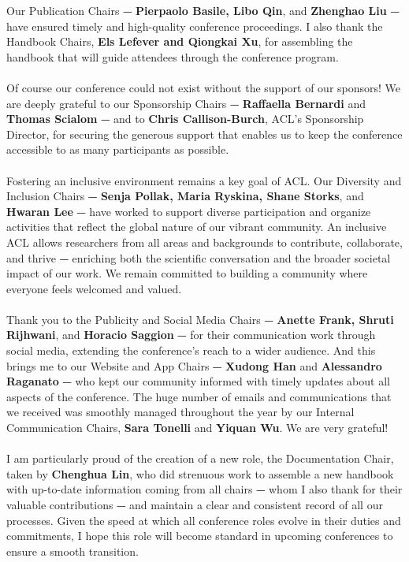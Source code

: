 Our Publication Chairs ⏤ \textbf{Pierpaolo Basile, Libo Qin}, and \textbf{Zhenghao Liu} ⏤ have ensured timely and high-quality conference proceedings. I also thank the Handbook Chairs, \textbf{Els Lefever and Qiongkai Xu}, for assembling the handbook that will guide attendees through the conference program.\\
\\

Of course our conference could not exist without the support of our sponsors! We are deeply grateful to our Sponsorship Chairs ⏤ \textbf{Raffaella Bernardi} and \textbf{Thomas Scialom} ⏤ and to \textbf{Chris Callison-Burch}, ACL’s Sponsorship Director, for securing the generous support that enables us to keep the conference accessible to as many participants as possible.\\
\\

Fostering an inclusive environment remains a key goal of ACL. Our Diversity and Inclusion Chairs ⏤ \textbf{Senja Pollak, Maria Ryskina, Shane Storks}, and \textbf{Hwaran Lee} ⏤ have worked to support diverse participation and organize activities that reflect the global nature of our vibrant community. An inclusive ACL allows researchers from all areas and backgrounds to contribute, collaborate, and thrive ⏤ enriching both the scientific conversation and the broader societal impact of our work. We remain committed to building a community where everyone feels welcomed and valued.\\
\\

Thank you to the Publicity and Social Media Chairs ⏤ \textbf{Anette Frank, Shruti Rijhwani}, and \textbf{Horacio Saggion} ⏤ for their communication work through social media, extending the conference’s reach to a wider audience. And this brings me to our Website and App Chairs ⏤ \textbf{Xudong Han} and \textbf{Alessandro Raganato} ⏤ who kept our community informed with timely updates about all aspects of the conference. The huge number of emails and communications that we received was smoothly managed throughout the year by our Internal Communication Chairs, \textbf{Sara Tonelli} and \textbf{Yiquan Wu}. We are very grateful!\\
\\

I am particularly proud of the creation of a new role, the Documentation Chair, taken by \textbf{Chenghua Lin}, who did strenuous work to assemble a new handbook with up-to-date information coming from all chairs ⏤ whom I also thank for their valuable contributions ⏤ and maintain a clear and consistent record of all our processes. Given the speed at which all conference roles evolve in their duties and commitments, I hope this role will become standard in upcoming conferences to ensure a smooth transition.\\
\\

